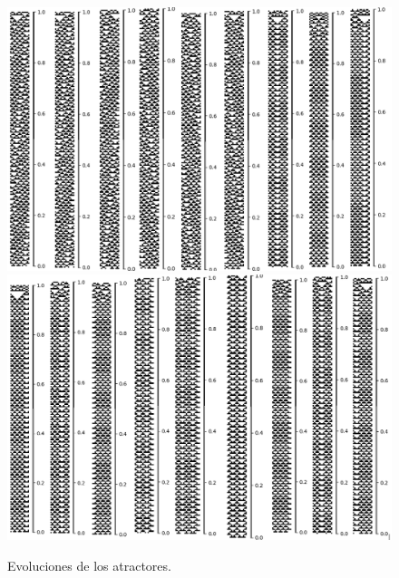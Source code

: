 \documentclass[11pt]{article}
\begin{document}
			\begin{figure}[H]
			\centering
			\includegraphics[scale=0.3]{resources/Atractores54/atractor_54_size_15_res.png}
			\includegraphics[scale=0.3]{resources/Atractores54/atractor_54_size_15_res1.png}
			\caption{Evoluciones de los atractores.}\label{fig:picture}
			\end{figure}
\end{document}
